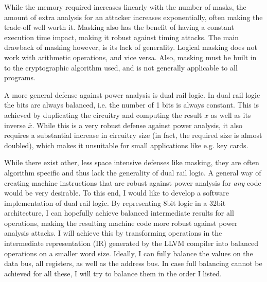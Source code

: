 \documentclass{article}
\begin{document}
While the memory required increases linearly with the number of masks, the amount of extra analysis for an attacker increases exponentially, often making the trade-off well worth it.
Masking also has the benefit of having a constant execution time impact, making it robust against timing attacks.
The main drawback of masking however, is its lack of generality.
Logical masking does not work with arithmetic operations, and vice versa. %
Also, masking must be built in to the cryptographic algorithm used, and is not generally applicable to all programs.

A more general defense against power analysis is dual rail logic. \cite{sokolov2005design}
In dual rail logic the bits are always balanced, i.e. the number of 1 bits is always constant.
This is achieved by duplicating the circuitry and computing the result $x$ as well as its inverse $\bar{x}$.
While this is a very robust defense against power analysis, it also requires a substantial increase in circuitry size (in fact, the required size is almost doubled), which makes it unsuitable for small applications like e.g. key cards.

While there exist other, less space intensive defenses like masking, they are often algorithm specific and thus lack the generality of dual rail logic.
A general way of creating machine instructions that are robust against power analysis for \emph{any} code would be very desirable.
To this end, I would like to develop a software implementation of dual rail logic.
By representing 8bit logic in a 32bit architecture, I can hopefully achieve balanced intermediate results for all operations, making the resulting machine code more robust against power analysis attacks.
I will achieve this by transforming operations in the intermediate representation (IR) generated by the LLVM compiler into balanced operations on a smaller word size.
Ideally, I can fully balance the values on the data bus, all registers, as well as the address bus.
In case full balancing cannot be achieved for all these, I will try to balance them in the order I listed.
\end{document}
